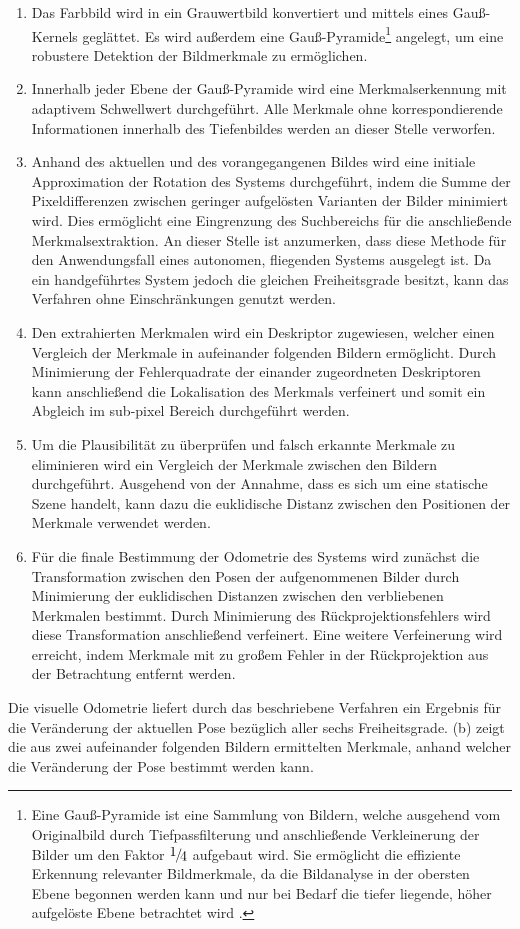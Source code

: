 \begin{enumerate}
\item Das Farbbild wird in ein Grauwertbild konvertiert und mittels eines Gauß-Kernels geglättet. Es wird außerdem eine Gauß-Pyramide\footnote{Eine Gauß-Pyramide ist eine Sammlung von Bildern, welche ausgehend vom Originalbild durch Tiefpassfilterung und anschließende Verkleinerung der Bilder um den Faktor $\nicefrac{1}{4}$ aufgebaut wird. Sie ermöglicht die effiziente Erkennung relevanter Bildmerkmale, da die Bildanalyse in der obersten Ebene begonnen werden kann und nur bei Bedarf die tiefer liegende, höher aufgelöste Ebene betrachtet wird \cite{Nischwitz20112}.} angelegt, um eine robustere Detektion der Bildmerkmale zu ermöglichen.
\item Innerhalb jeder Ebene der Gauß-Pyramide wird eine Merkmalserkennung mit adaptivem Schwellwert durchgeführt. Alle Merkmale ohne korrespondierende Informationen innerhalb des Tiefenbildes werden an dieser Stelle verworfen.
\item Anhand des aktuellen und des vorangegangenen Bildes wird eine initiale Approximation der Rotation des Systems durchgeführt, indem die Summe der Pixeldifferenzen zwischen geringer aufgelösten Varianten der Bilder minimiert wird. Dies ermöglicht eine Eingrenzung des Suchbereichs für die anschließende Merkmalsextraktion. An dieser Stelle ist anzumerken, dass diese Methode für den Anwendungsfall eines autonomen, fliegenden Systems ausgelegt ist. Da ein handgeführtes System jedoch die gleichen Freiheitsgrade besitzt, kann das Verfahren ohne Einschränkungen genutzt werden.
\item Den extrahierten Merkmalen wird ein Deskriptor zugewiesen, welcher einen Vergleich der Merkmale in aufeinander folgenden Bildern ermöglicht. Durch Minimierung der Fehlerquadrate der einander zugeordneten Deskriptoren kann anschließend die Lokalisation des Merkmals verfeinert und somit ein Abgleich im sub-pixel Bereich durchgeführt werden.
\item Um die Plausibilität zu überprüfen und falsch erkannte Merkmale zu eliminieren wird ein Vergleich der Merkmale zwischen den Bildern durchgeführt. Ausgehend von der Annahme, dass es sich um eine statische Szene handelt, kann dazu die euklidische Distanz zwischen den Positionen der Merkmale verwendet werden.
\item Für die finale Bestimmung der Odometrie des Systems wird zunächst die Transformation zwischen den Posen der aufgenommenen Bilder durch Minimierung der euklidischen Distanzen zwischen den verbliebenen Merkmalen bestimmt. Durch Minimierung des Rückprojektionsfehlers wird diese Transformation anschließend verfeinert. Eine weitere Verfeinerung wird erreicht, indem Merkmale mit zu großem Fehler in der Rückprojektion aus der Betrachtung entfernt werden.
\end{enumerate}
Die visuelle Odometrie liefert durch das beschriebene Verfahren ein Ergebnis für die Veränderung der aktuellen Pose bezüglich aller sechs Freiheitsgrade.  (b) zeigt die aus zwei aufeinander folgenden Bildern ermittelten Merkmale, anhand welcher die Veränderung der Pose bestimmt werden kann.\\

